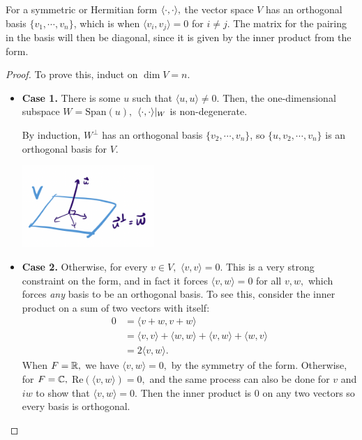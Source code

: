 \begin{theorem}
For a symmetric or Hermitian form $\langle \cdot, \cdot \rangle,$ the vector space $V$ has an orthogonal basis $\{v_1, \cdots, v_n\}$, which is when $\langle v_i, v_j \rangle = 0$ for $i \neq j.$ The matrix for the pairing in the basis will then be diagonal, since it is given by the inner product from the form. 
\end{theorem}

\begin{proof}
To prove this, induct on $\dim V = n.$ 
\begin{itemize}
    \item \textbf{Case 1.} There is some $u$ such that $\langle u, u \rangle \neq 0.$ Then, the one-dimensional subspace $W = \text{Span}(u),$ $\langle \cdot, \cdot \rangle|_W$ is non-degenerate. 
    
    By induction, $W^\perp$ has an orthogonal basis $\{v_2, \cdots, v_n\}$, so $\{u, v_2, \cdots, v_n\}$ is an orthogonal basis for $V.$
    
    \begin{center}
    \includegraphics[width=5cm]{Lecture Files and Images/lec26-thm.png}
\end{center}

    \item \textbf{Case 2.} Otherwise, for every $v \in V,$ $\langle v, v \rangle = 0.$ This is a very strong constraint on the form, and in fact it forces $\langle v, w\rangle = 0$ for all $v, w,$ which forces \emph{any} basis to be an orthogonal basis. 
    To see this, consider the inner product on a sum of two vectors with itself:
    \begin{align*}
        0 &= \langle v + w, v + w \rangle \\
        &= \langle v, v \rangle + \langle w, w \rangle + \langle v, w \rangle + \langle w, v\rangle \\
        &= 2\langle v, w \rangle.
    \end{align*}
    When $F = \mathbb R,$ we have $\langle v, w \rangle = 0,$ by the symmetry of the form. Otherwise, for $F = \mathbb C,$ $\text{Re}(\langle v, w \rangle) = 0,$ and the same process can also be done for $v$ and $iw$ to show that $\langle v, w \rangle = 0.$ Then the inner product is 0 on any two vectors so every basis is orthogonal.
\end{itemize}
\end{proof}
